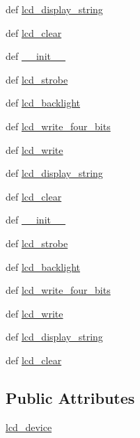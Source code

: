 \begin{DoxyCompactItemize}
def \hyperlink{classdriver_1_1DRIVER__CORE_1_1LCD_a164b4819a2e592ae683f4db5902d88f2}{lcd\+\_\+display\+\_\+string}
\item 
def \hyperlink{classdriver_1_1DRIVER__CORE_1_1LCD_a3242b603d9dd21803d4283e714d76c1e}{lcd\+\_\+clear}
\item 
def \hyperlink{classdriver_1_1DRIVER__CORE_1_1LCD_a42d8dfae2030675de36c798311a4c081}{\+\_\+\+\_\+init\+\_\+\+\_\+}
\item 
def \hyperlink{classdriver_1_1DRIVER__CORE_1_1LCD_adb4ade1f425d0a6e2381d0867ee1b28e}{lcd\+\_\+strobe}
\item 
def \hyperlink{classdriver_1_1DRIVER__CORE_1_1LCD_a8e3c81f32062f6696ab645b4c3b5ef04}{lcd\+\_\+backlight}
\item 
def \hyperlink{classdriver_1_1DRIVER__CORE_1_1LCD_a68e940af4dc6aa7e973d87b4f2aab36e}{lcd\+\_\+write\+\_\+four\+\_\+bits}
\item 
def \hyperlink{classdriver_1_1DRIVER__CORE_1_1LCD_ab58cedfbef364410e3eb958a2af041fd}{lcd\+\_\+write}
\item 
def \hyperlink{classdriver_1_1DRIVER__CORE_1_1LCD_a164b4819a2e592ae683f4db5902d88f2}{lcd\+\_\+display\+\_\+string}
\item 
def \hyperlink{classdriver_1_1DRIVER__CORE_1_1LCD_a3242b603d9dd21803d4283e714d76c1e}{lcd\+\_\+clear}
\item 
def \hyperlink{classdriver_1_1DRIVER__CORE_1_1LCD_a42d8dfae2030675de36c798311a4c081}{\+\_\+\+\_\+init\+\_\+\+\_\+}
\item 
def \hyperlink{classdriver_1_1DRIVER__CORE_1_1LCD_adb4ade1f425d0a6e2381d0867ee1b28e}{lcd\+\_\+strobe}
\item 
def \hyperlink{classdriver_1_1DRIVER__CORE_1_1LCD_a8e3c81f32062f6696ab645b4c3b5ef04}{lcd\+\_\+backlight}
\item 
def \hyperlink{classdriver_1_1DRIVER__CORE_1_1LCD_a68e940af4dc6aa7e973d87b4f2aab36e}{lcd\+\_\+write\+\_\+four\+\_\+bits}
\item 
def \hyperlink{classdriver_1_1DRIVER__CORE_1_1LCD_ab58cedfbef364410e3eb958a2af041fd}{lcd\+\_\+write}
\item 
def \hyperlink{classdriver_1_1DRIVER__CORE_1_1LCD_a164b4819a2e592ae683f4db5902d88f2}{lcd\+\_\+display\+\_\+string}
\item 
def \hyperlink{classdriver_1_1DRIVER__CORE_1_1LCD_a3242b603d9dd21803d4283e714d76c1e}{lcd\+\_\+clear}
\end{DoxyCompactItemize}
\subsection*{Public Attributes}
\begin{DoxyCompactItemize}
\item 
\hyperlink{classdriver_1_1DRIVER__CORE_1_1LCD_a9458e1763c73b9e7ab08bad2d1d3634b}{lcd\+\_\+device}
\end{DoxyCompactItemize}
